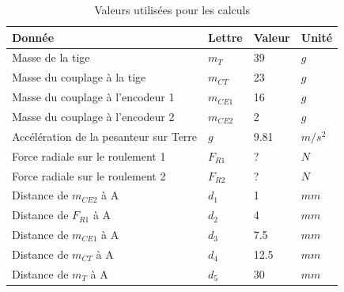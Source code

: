\begin{table}[H]
    \centering
    \caption{Valeurs utilisées pour les calculs}
    \label{tab:ValCalcRoul}
    \begin{tabular}{|l|l|l|l|}
        \hline
        \textbf{Donnée}                        & \textbf{Lettre} & \textbf{Valeur} & \textbf{Unité} \\ \hline
        Masse de la tige                       & $m_T$           & 39              & $g$            \\ \hline
        Masse du couplage à la tige            & $m_{CT}$        & 23              & $g$            \\ \hline
        Masse du couplage à l'encodeur 1       & $m_{CE1}$       & 16              & $g$            \\ \hline
        Masse du couplage à l'encodeur 2       & $m_{CE2}$       & 2               & $g$            \\ \hline
        Accélération de la pesanteur sur Terre & $g$             & 9.81            & $m/s^2$        \\ \hline
        Force radiale sur le roulement 1       & $F_{R1}$        & ?               & $N$            \\ \hline
        Force radiale sur le roulement 2       & $F_{R2}$        & ?               & $N$            \\ \hline
        Distance de $m_{CE2}$ à A              & $d_1$           & 1               & $mm$           \\ \hline
        Distance de $F_{R1}$ à A               & $d_2$           & 4               & $mm$           \\ \hline
        Distance de $m_{CE1}$ à A              & $d_3$           & 7.5             & $mm$           \\ \hline
        Distance de $m_{CT}$ à A               & $d_4$           & 12.5            & $mm$           \\ \hline
        Distance de $m_{T}$ à A                & $d_5$           & 30              & $mm$           \\ \hline
    \end{tabular}%
\end{table}

